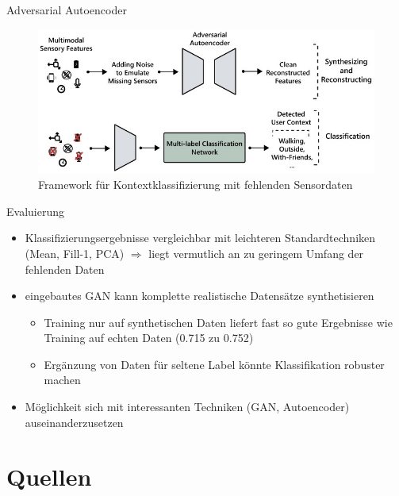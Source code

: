 \documentclass[10pt,%
	wide,%
	xcolor={x11names},%
	hyperref={colorlinks},%
	pantone312,%
	handout,%
	]{beamer}
\begin{document}
\begin{frame}[t]{Adversarial Autoencoder}
	\begin{figure}
		\centering
		\includegraphics[scale=4.0]{aae}
		\caption{Framework für Kontextklassifizierung mit fehlenden Sensordaten \cite{sol18}}
	\end{figure}
\end{frame}

\begin{frame}[t]{Evaluierung}
	\begin{itemize}
		\item Klassifizierungsergebnisse vergleichbar mit leichteren Standardtechniken (Mean, Fill-1, PCA) $\Rightarrow$ liegt vermutlich an zu geringem Umfang der fehlenden Daten
		\item eingebautes GAN kann komplette realistische Datensätze synthetisieren
		\begin{itemize}
			\item Training nur auf synthetischen Daten liefert fast so gute Ergebnisse wie Training auf echten Daten (0.715 zu 0.752)
			\item Ergänzung von Daten für seltene Label könnte Klassifikation robuster machen
		\end{itemize}
		\item Möglichkeit sich mit interessanten Techniken (GAN, Autoencoder) auseinanderzusetzen
	\end{itemize}
\end{frame}

\section*{Quellen}
\begin{frame}[allowframebreaks,t]{\secname}
	\printbibliography
\end{frame}
\end{document}
